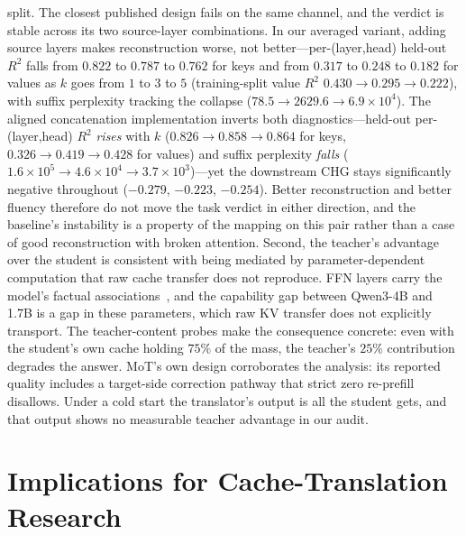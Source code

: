 \documentclass[10pt]{article}
\begin{document}
split. The closest published design fails on the same channel, and the verdict
is stable across its two source-layer combinations. In our averaged variant,
adding source layers makes reconstruction worse, not better---per-(layer,head)
held-out $R^2$ falls from $0.822$ to $0.787$ to $0.762$ for keys and from
$0.317$ to $0.248$ to $0.182$ for values as $k$ goes from $1$ to $3$ to $5$
(training-split value $R^2$ $0.430 \to 0.295 \to 0.222$), with suffix
perplexity tracking the collapse ($78.5 \to 2629.6 \to 6.9\times10^{4}$). The
aligned concatenation implementation inverts both diagnostics---held-out
per-(layer,head) $R^2$ \emph{rises} with $k$ ($0.826 \to 0.858 \to 0.864$ for
keys, $0.326 \to 0.419 \to 0.428$ for values) and suffix perplexity
\emph{falls} ($1.6\times10^{5} \to 4.6\times10^{4} \to 3.7\times10^{3}$)---yet
the downstream CHG stays significantly negative throughout ($-0.279$, $-0.223$,
$-0.254$). Better reconstruction and better fluency therefore do not move the
task verdict in either direction, and the baseline's instability is a property
of the mapping on this pair rather than a case of good reconstruction with
broken attention. Second, the teacher's advantage over the student is consistent with
being mediated by parameter-dependent computation that raw cache transfer does
not reproduce. FFN layers carry the model's factual
associations~\citep{ffnmemory2021}, and the capability gap between Qwen3-4B
and 1.7B is a gap in these parameters, which raw KV transfer does not explicitly transport. The
teacher-content probes make the consequence concrete: even with the student's own
cache holding $75\%$ of the mass, the teacher's $25\%$ contribution degrades
the answer. MoT's own design corroborates the analysis: its reported quality
includes a target-side correction pathway that strict zero re-prefill disallows. Under a cold
start the translator's output is all the student gets, and that output shows
no measurable teacher advantage in our audit.

\section{Implications for Cache-Translation Research}
\label{sec:implications}
\end{document}
